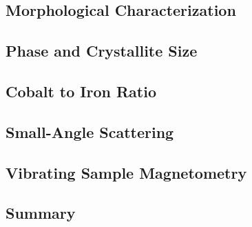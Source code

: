 \documentclass[\main/dresen_thesis.tex]{subfiles}
\renewcommand{\thisPath}{\main/chapters/monolayers/nanoparticles/}
\begin{document}
  \label{sec:monolayers:nanoparticles}

  \subsection{Morphological Characterization}
    
      \FloatBarrier

  \subsection{Phase and Crystallite Size}
  
    \FloatBarrier

  \subsection{Cobalt to Iron Ratio}
  
    \FloatBarrier

  \subsection{Small-Angle Scattering}
  
    \FloatBarrier

  \subsection{Vibrating Sample Magnetometry}
  
    \FloatBarrier

  \subsection{Summary}
  
    \FloatBarrier
\end{document}
